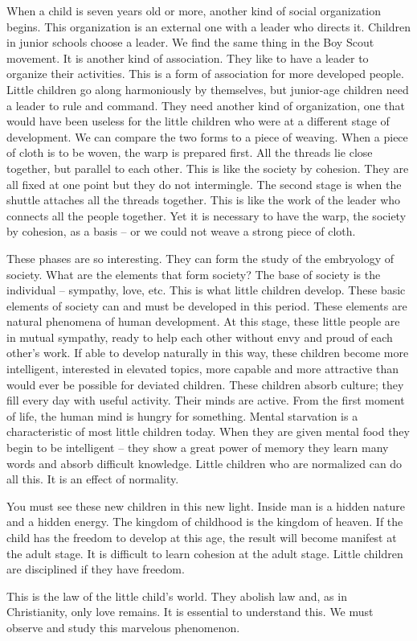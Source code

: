 \documentclass[lang=cn,10pt]{elegantbook}
\begin{document}
When a child is seven years old or more, another kind of social organization begins. This organization is an external one with a leader who directs it. Children in junior schools choose a leader. We find the same thing in the Boy Scout movement. It is another kind of association. They like to have a leader to organize their activities. This is a form of association for more developed people. Little children go along harmoniously by themselves, but junior-age children need a leader to rule and command. They need another kind of organization, one that would have been useless for the little children who were at a different stage of development. We can compare the two forms to a piece of weaving. When a piece of cloth is to be woven, the warp is prepared first. All the threads lie close together, but parallel to each other. This is like the society by cohesion. They are all fixed at one point but they do not intermingle. The second stage is when the shuttle attaches all the threads together. This is like the work of the leader who connects all the people together. Yet it is necessary to have the warp, the society by cohesion, as a basis – or we could not weave a strong piece of cloth.

These phases are so interesting. They can form the study of the embryology of society. What are the elements that form society? The base of society is the individual – sympathy, love, etc. This is what little children develop. These basic elements of society can and must be developed in this period. These elements are natural phenomena of human development. At this stage, these little people are in mutual sympathy, ready to help each other without envy and proud of each other's work. If able to develop naturally in this way, these
children become more intelligent, interested in elevated topics, more capable and more attractive than would ever be possible for deviated children. These children absorb culture; they fill every day with useful activity. Their minds are active. From the first moment of life, the human mind is hungry for something. Mental starvation is a characteristic of most little children today. When they are given mental food they begin to be intelligent – they show a great power of memory they learn many words and absorb difficult knowledge. Little
children who are normalized can do all this. It is an effect of normality.

You must see these new children in this new light. Inside man is a hidden nature and a hidden energy. The kingdom of childhood is the kingdom of heaven. If the child has the freedom to develop at this age, the result will become manifest at the adult stage. It is difficult to learn cohesion at the adult stage. Little children are disciplined if they have freedom.

This is the law of the little child's world. They abolish law and, as in Christianity, only love remains. It is essential to understand this. We must observe and study this marvelous phenomenon.
\end{document}
